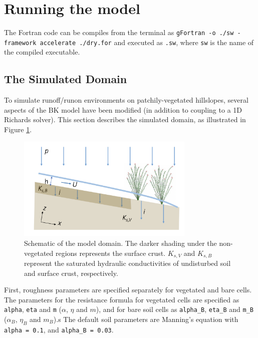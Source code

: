 \documentclass{article}
\newcommand{\code}[1]{\texttt{#1}}
\begin{document}
 
\section{Running the model}

The Fortran code can be compiles from the terminal as
    \code{gFortran -o ./sw  -framework accelerate ./dry.for}
and executed as \code{.sw}, where \code{sw} is the name of the compiled executable.
  


\subsection{The Simulated Domain}

To simulate runoff/runon environments on patchily-vegetated hillslopes, several aspects of the BK model have been modified (in addition to coupling to a 1D Richards solver).  This section describes the simulated domain, as illustrated in Figure \ref{domain_schematic}.

 \begin{figure}[h]
 \centering
\includegraphics[width=20pc]{grid/domain_schematic.png}
 \caption{Schematic of the model domain.  The darker shading under the non-vegetated regions represents the surface crust.  $K_{s,V}$ and $K_{s,B}$  represent the saturated hydraulic conductivities of undisturbed soil and surface crust, respectively.}
 \label{domain_schematic}
 \end{figure}
 
 
First,  roughness parameters are specified separately for vegetated and bare cells. 
 The parameters for the resistance formula for vegetated cells are specified as  \code{alpha}, \code{eta} and \code{m}  ($\alpha$, $\eta$ and $m$), and for bare soil cells as  \code{alpha\_B}, \code{eta\_B} and \code{m\_B}  ($\alpha_B$, $\eta_B$ and $m_B$).s
  The default soil parameters are Manning's equation with \code{alpha = 0.1}, and \code{alpha\_B = 0.03}.
\end{document}
